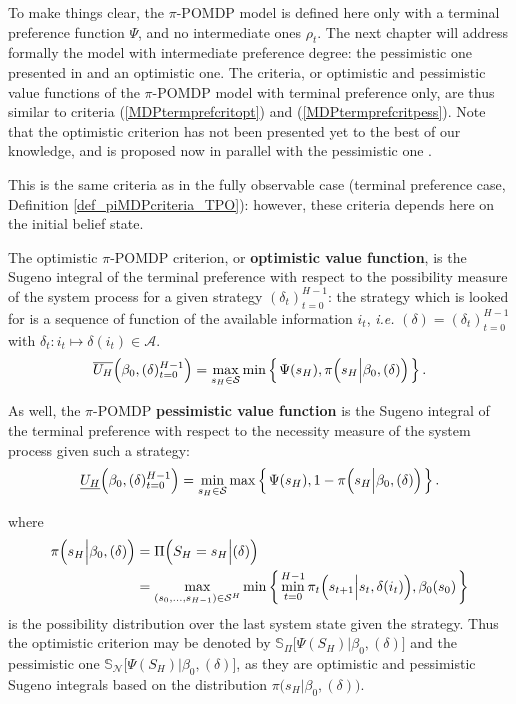 To make things clear,
the $\pi$-POMDP model is defined here 
only with a terminal preference function $\Psi$,
and no intermediate ones $\rho_t$.
The next chapter will address formally the model with intermediate preference degree:
the pessimistic one presented in \cite{Sabbadin:1999:pipomdp} and 
an optimistic one. 
The criteria, or optimistic and pessimistic value functions of the $\pi$-POMDP model with terminal preference only,
are thus similar to criteria (\ref{MDPtermprefcritopt}) and (\ref{MDPtermprefcritpess}).
Note that the optimistic criterion has not been presented yet to the best of our knowledge,
and is proposed now in parallel with the pessimistic one \cite{Sabbadin:1999:pipomdp}.
\begin{Def}
\label{def_piPOMDPvaluefunction}
This is the same criteria as in the fully observable case (terminal preference case, Definition \ref{def_piMDPcriteria_TPO}):
however, these criteria depends here on the initial belief state. 

The optimistic $\pi$-POMDP criterion, or \textbf{optimistic value function}, 
is the Sugeno integral of the terminal preference 
with respect to the possibility measure of the system process
for a given strategy $(\delta_t)_{t=0}^{H-1}$:
the strategy which is looked for is a sequence of function of the available information $i_t$,
\textit{i.e.} $(\delta) = (\delta_t)_{t=0}^{H-1}$ with $\delta_t: i_t \mapsto \delta(i_t) \in \mathcal{A}$.
\begin{equation}
\label{equation_piPOMDPcriterionopt}
\overline{U_H}\Big(\beta_0,(\delta)_{t=0}^{H-1}\Big) = \max_{ s_H \in \mathcal{S}} \min \left\{ \left.  \Psi(s_H), \pi \Big( s_H \Big\vert \beta_0, (\delta) \Big)  \right. \right\}.
\end{equation}

As well, the $\pi$-POMDP \textbf{pessimistic value function} is the Sugeno integral of the terminal preference with respect to the necessity measure of the system process
given such a strategy:
\begin{equation}
\label{equation_piPOMDPcriterionpess}
\underline{U_H}\Big(\beta_0,(\delta)_{t=0}^{H-1}\Big) = \min_{ s_H \in \mathcal{S}} \max \left\{ \left.  \Psi(s_H), 1 - \pi \Big( s_H \Big\vert \beta_0, (\delta) \Big)  \right. \right\}.
\end{equation}

where
\begin{align*} 
\pi \Big( s_H \Big\vert \beta_0, (\delta) \Big) &= \Pi \Big( S_H = s_H \Big\vert (\delta) \Big) \\
&= \max_{(s_0,\ldots,s_{H-1}) \in \mathcal{S}^H} \min \left\{ \left.  \min_{t=0}^{H-1} \pi_t \Big( s_{t+1} \Big\vert s_t, \delta(i_t) \Big), \beta_0(s_0)  \right. \right\} 
\end{align*}
is the possibility distribution over the last system state given the strategy.
Thus the optimistic criterion may be denoted by $\mathbb{S}_{\Pi} \Big[ \Psi(S_H) \Big\vert \beta_0, (\delta) \Big] $ and the pessimistic one $\mathbb{S}_{\mathcal{N}} \Big[ \Psi(S_H) \Big\vert \beta_0, (\delta) \Big]$, as they are optimistic and pessimistic Sugeno integrals based on the distribution $\pi \Big( s_H \Big\vert \beta_0, (\delta) \Big)$.
\end{Def}

